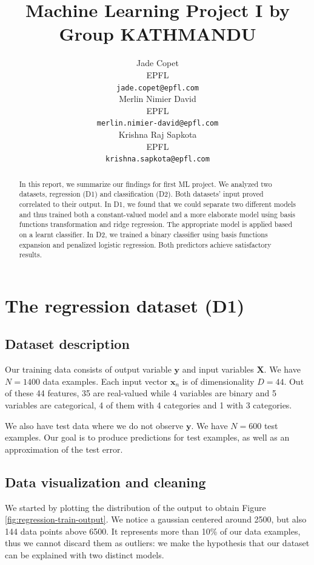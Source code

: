 \documentclass{article} %
\title{Machine Learning Project I by Group KATHMANDU}
\author{
Jade Copet\\
EPFL \\
\texttt{jade.copet@epfl.com} \\
\And
Merlin Nimier David\\
EPFL \\
\texttt{merlin.nimier-david@epfl.com} \\
\And
Krishna Raj Sapkota\\
EPFL \\
\texttt{krishna.sapkota@epfl.com} \\
}
\begin{document}
\maketitle



\begin{abstract}
  In this report, we summarize our findings for first ML project. We analyzed two datasets, regression (D1) and classification (D2). Both datasets' input proved correlated to their output. In D1, we found that we could separate two different models and thus trained both a constant-valued model and a more elaborate model using basis functions transformation and ridge regression. The appropriate model is applied based on a learnt classifier. In D2, we trained a binary classifier using basis functions expansion and penalized logistic regression. Both predictors achieve satisfactory results.
\end{abstract}



\section{The regression dataset (D1)}

  \subsection{Dataset description}
  Our training data consists of output variable $\mathbf{y}$ and input variables $\mathbf{X}$. We have $N = 1400$ data examples. Each input vector $\mathbf{x}_n$ is of dimensionality $D = 44$. Out of these 44 features, 35 are real-valued while 4 variables are binary and 5 variables are categorical, 4 of them with 4 categories and 1 with 3 categories.

  We also have test data where we do not observe $\mathbf{y}$. We have $N = 600$ test examples. Our goal is to produce predictions for test examples, as well as an approximation of the test error.

  \subsection{Data visualization and cleaning}
  We started by plotting the distribution of the output to obtain Figure \ref{fig:regression-train-output}. We notice a gaussian centered around 2500, but also 144 data points above 6500. It represents more than 10\% of our data examples, thus we cannot discard them as outliers: we make the hypothesis that our dataset can be explained with two distinct models.
\end{document}
